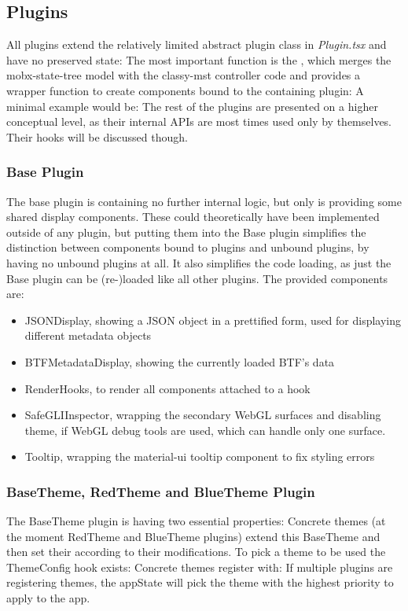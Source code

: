 \subsection{Plugins}\label{sec_plugins}
All plugins extend the relatively limited abstract plugin class in
\emph{Plugin.tsx} and have no preserved state:
The most important function is the , which merges the
mobx-state-tree model with the classy-mst controller code and provides a wrapper
function to create components bound to the containing plugin:
A minimal example would be:
The rest of the plugins are presented on a higher conceptual level, as their
internal APIs are most times used only by themselves. Their hooks will be
discussed though.

\subsubsection{Base Plugin}
The base plugin is containing no further internal logic, but only is providing
some shared display components. These could theoretically have been implemented
outside of any plugin, but putting them into the Base plugin simplifies the
distinction between components bound to plugins and unbound plugins, by having
no unbound plugins at all. It also simplifies the code loading, as just the Base
plugin can be (re-)loaded like all other plugins. The provided components are:
\begin{itemize}
\item JSONDisplay, showing a JSON object in a prettified form, used for
  displaying different metadata objects
\item BTFMetadataDisplay, showing the currently loaded BTF's data
\item RenderHooks, to render all components attached to a hook
\item SafeGLIInspector, wrapping the secondary WebGL surfaces and disabling
    theme, if WebGL debug tools are used, which can handle only one surface.
\item Tooltip, wrapping the material-ui tooltip component to fix styling errors
\end{itemize}

\subsubsection{BaseTheme, RedTheme and BlueTheme Plugin}
The BaseTheme plugin is having two essential properties:
Concrete themes (at the moment RedTheme and BlueTheme plugins) extend this
BaseTheme and then set their  according to their
modifications. To pick a theme to be used the ThemeConfig hook exists:
Concrete themes register with:
If multiple plugins are registering themes, the appState will pick the theme
with the highest priority to apply to the app.

